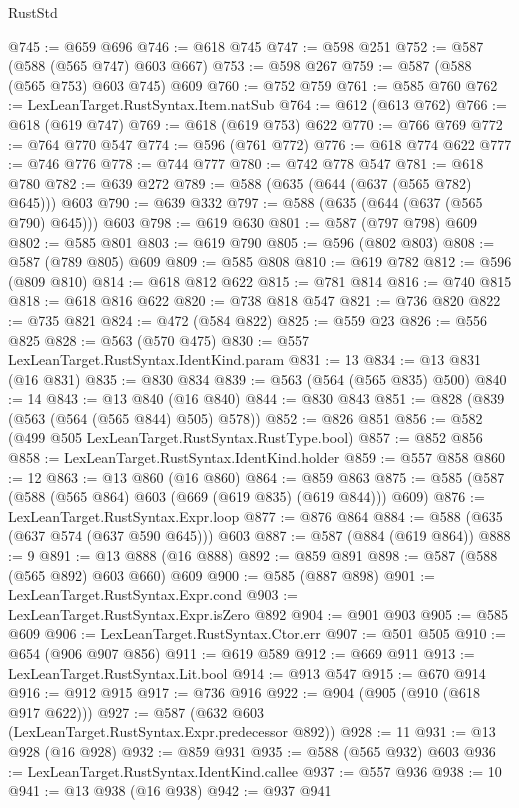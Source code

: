 \begin{lexlean}{RustStd}
\begin{coremodule}
@745 := @659 @696
@746 := @618 @745
@747 := @598 @251
@752 := @587 (@588 (@565 @747) @603 @667)
@753 := @598 @267
@759 := @587 (@588 (@565 @753) @603 @745) @609
@760 := @752 @759
@761 := @585 @760
@762 := LexLeanTarget.RustSyntax.Item.natSub
@764 := @612 (@613 @762)
@766 := @618 (@619 @747)
@769 := @618 (@619 @753) @622
@770 := @766 @769
@772 := @764 @770 @547
@774 := @596 (@761 @772)
@776 := @618 @774 @622
@777 := @746 @776
@778 := @744 @777
@780 := @742 @778 @547
@781 := @618 @780
@782 := @639 @272
@789 := @588 (@635 (@644 (@637 (@565 @782) @645))) @603
@790 := @639 @332
@797 := @588 (@635 (@644 (@637 (@565 @790) @645))) @603
@798 := @619 @630
@801 := @587 (@797 @798) @609
@802 := @585 @801
@803 := @619 @790
@805 := @596 (@802 @803)
@808 := @587 (@789 @805) @609
@809 := @585 @808
@810 := @619 @782
@812 := @596 (@809 @810)
@814 := @618 @812 @622
@815 := @781 @814
@816 := @740 @815
@818 := @618 @816 @622
@820 := @738 @818 @547
@821 := @736 @820
@822 := @735 @821
@824 := @472 (@584 @822)
@825 := @559 @23
@826 := @556 @825
@828 := @563 (@570 @475)
@830 := @557 LexLeanTarget.RustSyntax.IdentKind.param
@831 := 13
@834 := @13 @831 (@16 @831)
@835 := @830 @834
@839 := @563 (@564 (@565 @835) @500)
@840 := 14
@843 := @13 @840 (@16 @840)
@844 := @830 @843
@851 := @828 (@839 (@563 (@564 (@565 @844) @505) @578))
@852 := @826 @851
@856 := @582 (@499 @505 LexLeanTarget.RustSyntax.RustType.bool)
@857 := @852 @856
@858 := LexLeanTarget.RustSyntax.IdentKind.holder
@859 := @557 @858
@860 := 12
@863 := @13 @860 (@16 @860)
@864 := @859 @863
@875 := @585 (@587 (@588 (@565 @864) @603 (@669 (@619 @835) (@619 @844))) @609)
@876 := LexLeanTarget.RustSyntax.Expr.loop
@877 := @876 @864
@884 := @588 (@635 (@637 @574 (@637 @590 @645))) @603
@887 := @587 (@884 (@619 @864))
@888 := 9
@891 := @13 @888 (@16 @888)
@892 := @859 @891
@898 := @587 (@588 (@565 @892) @603 @660) @609
@900 := @585 (@887 @898)
@901 := LexLeanTarget.RustSyntax.Expr.cond
@903 := LexLeanTarget.RustSyntax.Expr.isZero @892
@904 := @901 @903
@905 := @585 @609
@906 := LexLeanTarget.RustSyntax.Ctor.err
@907 := @501 @505
@910 := @654 (@906 @907 @856)
@911 := @619 @589
@912 := @669 @911
@913 := LexLeanTarget.RustSyntax.Lit.bool
@914 := @913 @547
@915 := @670 @914
@916 := @912 @915
@917 := @736 @916
@922 := @904 (@905 (@910 (@618 @917 @622)))
@927 := @587 (@632 @603 (LexLeanTarget.RustSyntax.Expr.predecessor @892))
@928 := 11
@931 := @13 @928 (@16 @928)
@932 := @859 @931
@935 := @588 (@565 @932) @603
@936 := LexLeanTarget.RustSyntax.IdentKind.callee
@937 := @557 @936
@938 := 10
@941 := @13 @938 (@16 @938)
@942 := @937 @941

\end{coremodule}
\end{lexlean}
